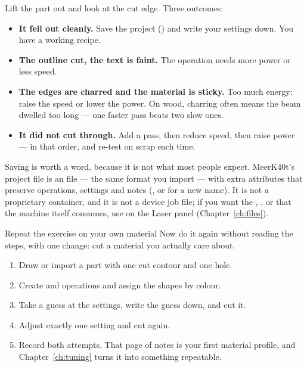 Lift the part out and look at the cut edge. Three outcomes:

\begin{itemize}
  \item \textbf{It fell out cleanly.} Save the project () and write
        your settings down. You have a working recipe.
  \item \textbf{The outline cut, the text is faint.} The 
        operation needs more power or less speed.
  \item \textbf{The edges are charred and the material is sticky.} Too much energy:
        raise the speed or lower the power. On wood, charring often means the
        beam dwelled too long --- one faster pass beats two slow ones.
  \item \textbf{It did not cut through.} Add a pass, then reduce speed, then raise
        power --- in that order, and re-test on scrap each time.
\end{itemize}

\noindent Saving is worth a word, because it is not what most people expect.
MeerK40t's project file is an  file --- the same format you import ---
with extra attributes that preserve operations, settings and notes
(, or  for a new name). It is not a proprietary
container, and it is not a device job file; if you want the ,
,  or  that the machine itself consumes, use
 on the Laser panel (Chapter~\ref{ch:files}).

\begin{tryit}{Repeat the exercise on your own material}
Now do it again without reading the steps, with one change: cut a material you
actually care about.
\begin{enumerate}[label=\arabic*.,leftmargin=1.4em]
  \item Draw or import a part with one cut contour and one hole.
  \item Create  and  operations and assign the
        shapes by colour.
  \item Take a guess at the settings, write the guess down, and cut it.
  \item Adjust exactly one setting and cut again.
  \item Record both attempts. That page of notes is your first material profile,
        and Chapter~\ref{ch:tuning} turns it into something repeatable.
\end{enumerate}
\end{tryit}
